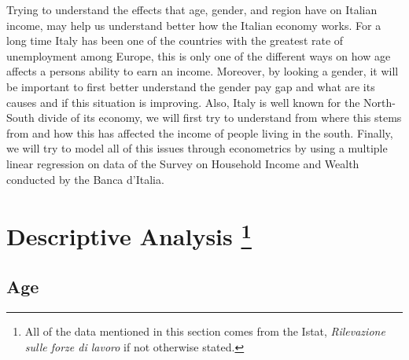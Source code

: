\documentclass[12pt]{article}
\begin{document}
\begin{spacing}{1.5}

Trying to understand the effects that age, gender, and region have on Italian income, may help us understand better how the Italian economy works. For a long time Italy has been one of the countries with the greatest rate of unemployment among Europe, this is only one of the different ways on how age affects a persons ability to earn an income. Moreover, by looking a gender, it will be important to first better understand the gender pay gap and what are its causes and if this situation is improving. Also, Italy is well known for the North-South divide of its economy, we will first try to understand from where this stems from and how this has affected the income of people living in the south. Finally, we will try to model all of this issues through econometrics by using a multiple linear regression on data of the Survey on Household Income and Wealth conducted by  the Banca d'Italia.

\end{spacing}

\section[Descriptive Analysis]{Descriptive Analysis \footnote{All of the data mentioned in this section comes from the Istat, \textit{Rilevazione sulle forze di lavoro} if not otherwise stated.}} 

\subsection{Age}
\end{document}
